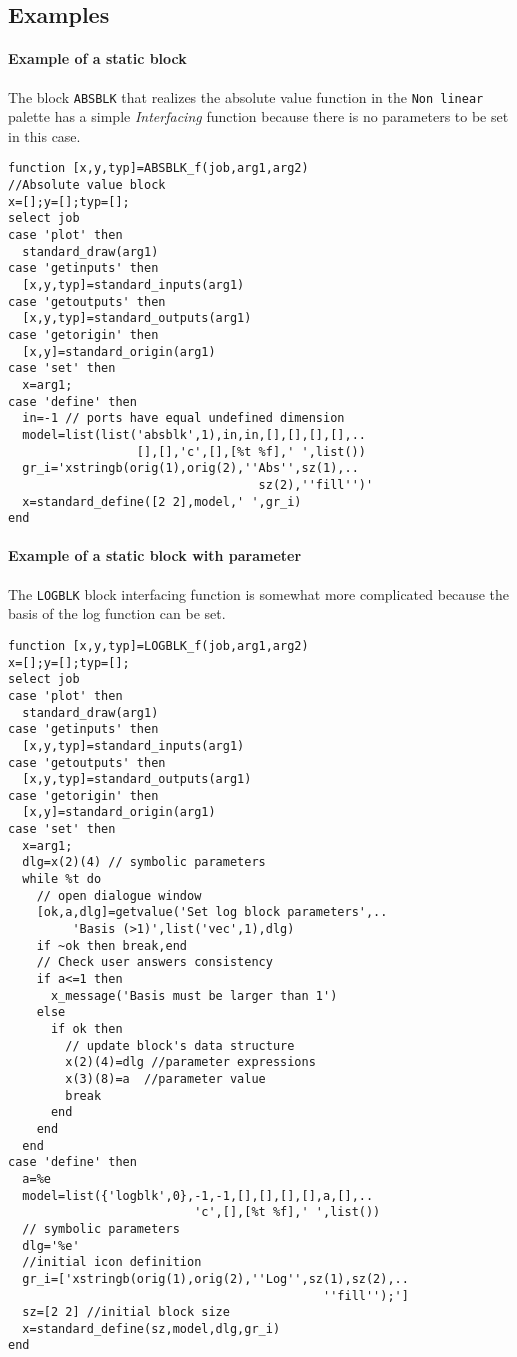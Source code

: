 \documentclass{book}
\newcommand{\interfacing}{{\em Interfacing }}
\begin{document}
\subsection{Examples}

\paragraph{Example of a static block}

The block {\tt ABSBLK} that realizes the absolute value function in the
{\tt Non linear} palette has a simple \interfacing function
because there is no parameters to be set in this case.

\begin{verbatim}
function [x,y,typ]=ABSBLK_f(job,arg1,arg2)
//Absolute value block
x=[];y=[];typ=[];
select job
case 'plot' then
  standard_draw(arg1)
case 'getinputs' then
  [x,y,typ]=standard_inputs(arg1)
case 'getoutputs' then
  [x,y,typ]=standard_outputs(arg1)
case 'getorigin' then
  [x,y]=standard_origin(arg1)
case 'set' then
  x=arg1;
case 'define' then
  in=-1 // ports have equal undefined dimension
  model=list(list('absblk',1),in,in,[],[],[],[],..
                  [],[],'c',[],[%t %f],' ',list())
  gr_i='xstringb(orig(1),orig(2),''Abs'',sz(1),..
                                   sz(2),''fill'')'
  x=standard_define([2 2],model,' ',gr_i)
end
\end{verbatim}


\paragraph{Example of a static block with parameter}
The {\tt LOGBLK} block interfacing function is somewhat
more complicated because the basis of the log function
can be set.

\begin{verbatim}
function [x,y,typ]=LOGBLK_f(job,arg1,arg2)
x=[];y=[];typ=[];
select job
case 'plot' then
  standard_draw(arg1)
case 'getinputs' then
  [x,y,typ]=standard_inputs(arg1)
case 'getoutputs' then
  [x,y,typ]=standard_outputs(arg1)
case 'getorigin' then
  [x,y]=standard_origin(arg1)
case 'set' then
  x=arg1;
  dlg=x(2)(4) // symbolic parameters
  while %t do
    // open dialogue window
    [ok,a,dlg]=getvalue('Set log block parameters',..
         'Basis (>1)',list('vec',1),dlg)
    if ~ok then break,end
    // Check user answers consistency
    if a<=1 then
      x_message('Basis must be larger than 1')
    else
      if ok then
        // update block's data structure 
        x(2)(4)=dlg //parameter expressions
        x(3)(8)=a  //parameter value
        break
      end
    end
  end
case 'define' then
  a=%e
  model=list({'logblk',0},-1,-1,[],[],[],[],a,[],..
                          'c',[],[%t %f],' ',list())
  // symbolic parameters
  dlg='%e' 
  //initial icon definition
  gr_i=['xstringb(orig(1),orig(2),''Log'',sz(1),sz(2),..
                                            ''fill'');']
  sz=[2 2] //initial block size
  x=standard_define(sz,model,dlg,gr_i)
end
\end{verbatim}
\end{document}
